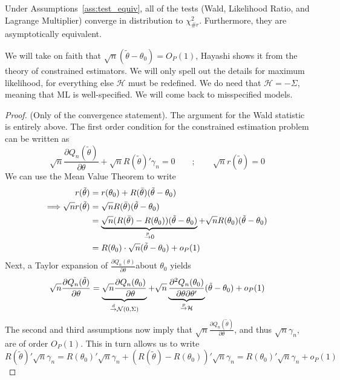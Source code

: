 \documentclass[10pt]{article}
\begin{document}
\begin{theorem}
	Under Assumptions~\ref{ass:test_equiv}, all of the tests (Wald, Likelihood Ratio, and Lagrange Multiplier) converge in distribution to $\chi^2_{\#r}$. Furthermore, they are asymptotically equivalent.
\end{theorem}
\begin{remark}
	We will take on faith that $\sqrt{n}(\tilde{\theta} - \theta_0) = O_P(1)$, Hayashi shows it from the theory of constrained estimators. We will only spell out the details for maximum likelihood, for everything else $\mathcal{H}$ must be redefined. We do need that $\mathcal{H} = -\Sigma$, meaning that ML is well-specified. We will come back to misspecified models.
\end{remark}
\begin{proof}
	(Only of the convergence statement). The argument for the Wald statistic is entirely above. The first order condition for the constrained estimation problem can be written as\[\sqrt{n}\frac{\partial Q_n(\tilde{\theta})}{\partial \theta} + \sqrt{n}R(\tilde{\theta})'\gamma_n = 0 \qquad ; \qquad \sqrt{n}r(\tilde{\theta}) = 0\] We can use the Mean Value Theorem to write 
	\begin{align*}
		r(\tilde{\theta}) &= r(\theta_0) + R(\bar{\theta})(\tilde{\theta}-\theta_0) \\
		\Longrightarrow \sqrt{n}r(\tilde{\theta}) &= \sqrt{n}R(\bar{\theta})(\tilde{\theta}-\theta_0) \\
		&= \underbrace{\sqrt{n}(R(\bar{\theta}) - R(\theta_0))(\tilde{\theta}-\theta_0)}_{\overset{p}{\to} 0} + \sqrt{n}R(\theta_0)(\tilde{\theta}-\theta_0) \\
		&= R(\theta_0) \cdot \sqrt{n} (\tilde{\theta} - \theta_0) + o_P(1)
	\end{align*}
	Next, a Taylor expansion of $\frac{\partial Q_n(\theta)}{\partial \theta}$about $\theta_0$ yields 
	\[
	\sqrt{n} \frac{\partial Q_n(\tilde{\theta})}{\partial \theta} = \underbrace{\sqrt{n} \frac{\partial Q_n(\theta_0)}{\partial \theta}}_{\overset{d}{\to} \mathcal{N}(0,\Sigma)} + \sqrt{n}\underbrace{\frac{\partial^2 Q_n(\theta_0)}{\partial \theta\partial \theta'}}_{\overset{p}{\to} \mathcal{H}}(\tilde{\theta} - \theta_0)+o_P(1)
	\]
	The second and third assumptions now imply that $\sqrt{n} \frac{\partial Q_n(\tilde{\theta})}{\partial \theta}$, and thus $\sqrt{n}\gamma_n$, are of order $O_P(1)$. This in turn allows us to write
	\[
	R(\tilde{\theta})' \sqrt{n} \gamma_n = R(\theta_0)'\sqrt{n}\gamma_n + (R(\tilde{\theta}) - R(\theta_0))' \sqrt{n}\gamma_n =  R(\theta_0)'\sqrt{n}\gamma_n + o_P(1)
\]
\end{proof}
\end{document}
